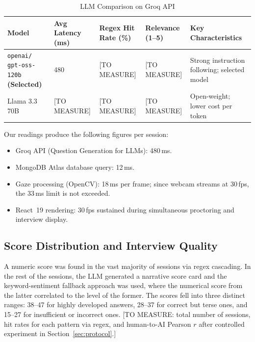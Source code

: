 \documentclass[conference]{IEEEtran}
\begin{document}
\begin{table}[htbp]
  \caption{LLM Comparison on Groq API}
  \label{tab:llm}
  \centering
  \renewcommand{\arraystretch}{1.3}
  \begin{tabular}{p{2.0cm} p{1.3cm} p{1.4cm} p{1.1cm} p{1.55cm}}
    \toprule
    \textbf{Model} &
    \textbf{Avg Latency (ms)} &
    \textbf{Regex Hit Rate (\%)} &
    \textbf{Relevance (1--5)} &
    \textbf{Key Characteristics} \\
    \midrule
    \texttt{openai/} \newline \texttt{gpt-oss-120b} \newline \textbf{(Selected)} &
    480 &
    {[TO MEASURE]} &
    {[TO MEASURE]} &
    Strong instruction following; selected model \\
    \addlinespace
    Llama 3.3 70B &
    {[TO MEASURE]} &
    {[TO MEASURE]} &
    {[TO MEASURE]} &
    Open-weight; lower cost per token \\
    \bottomrule
  \end{tabular}
\end{table}

Our readings produce the following figures per session:
\begin{itemize}
  \item Groq API (Question Generation for LLMs): 480\,ms.
  \item MongoDB Atlas database query: 12\,ms.
  \item Gaze processing (OpenCV): 18\,ms per frame; since webcam
    streams at 30\,fps, the 33\,ms limit is not exceeded.
  \item React~19 rendering: 30\,fps sustained during simultaneous
    proctoring and interview display.
\end{itemize}

\subsection{Score Distribution and Interview Quality}
A numeric score was found in the vast majority of sessions via regex
cascading. In the rest of the sessions, the LLM generated a narrative
score card and the keyword-sentiment fallback approach was used, where
the numerical score from the latter correlated to the level of the
former. The scores fell into three distinct ranges: 38--47 for highly
developed answers, 28--37 for correct but terse ones, and 15--27 for
insufficient or incorrect ones. [TO MEASURE: total number of sessions,
hit rates for each pattern via regex, and human-to-AI Pearson $r$ after
controlled experiment in Section~\ref{sec:protocol}.]
\end{document}
